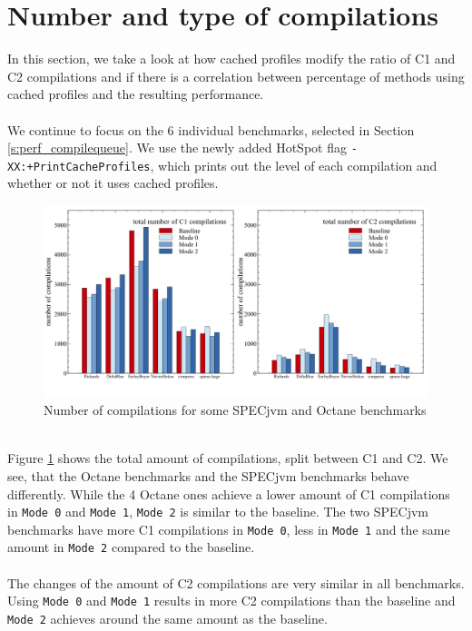 \section{Number and type of compilations}
\label{s:perf_compilenumber}
In this section, we take a look at how cached profiles modify the ratio of C1 and C2 compilations and if there is a correlation between percentage of methods using cached profiles and the resulting performance.
\\\\
We continue to focus on the 6 individual benchmarks, selected in Section \ref{s:perf_compilequeue}.
We use the newly added HotSpot flag \texttt{-XX:+PrintCacheProfiles}, which prints out the level of each compilation and whether or not it uses cached profiles.
\begin{figure}[ht!]
  \begin{center}
    \centering
    \includegraphics[width=1.0\textwidth]{figures/queue_total.png}
    \caption{Number of compilations for some SPECjvm and Octane benchmarks}
    \label{f:queue_total}
  \end{center}
\end{figure}
\\
Figure \ref{f:queue_total} shows the total amount of compilations, split between C1 and C2.
We see, that the Octane benchmarks and the SPECjvm benchmarks behave differently. While the 4 Octane ones achieve a lower amount of C1 compilations in \texttt{Mode 0} and \texttt{Mode 1}, \texttt{Mode 2} is similar to the baseline. The two SPECjvm benchmarks have more C1 compilations in \texttt{Mode 0}, less in \texttt{Mode 1} and the same amount in \texttt{Mode 2} compared to the baseline.
\\\\
The changes of the amount of C2 compilations are very similar in all benchmarks. Using \texttt{Mode 0} and \texttt{Mode 1} results in more C2 compilations than the baseline and \texttt{Mode 2} achieves around the same amount as the baseline.
